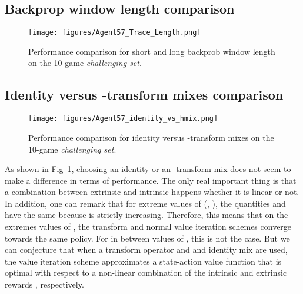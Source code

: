\documentclass{article}
\begin{document}
\clearpage
\subsection{Backprop window length comparison}
\label{app:tracelength}
\begin{figure}[!ht]
    \centering
    \texttt{[image: figures/Agent57\_Trace\_Length.png]}
    \caption{Performance comparison for short and long backprob window length on the 10-game \emph{challenging set}.}
\end{figure}

\subsection{Identity versus -transform mixes comparison}
\label{app:mix}
\begin{figure}[!ht]
    \centering
    \texttt{[image: figures/Agent57\_identity\_vs\_hmix.png]}
    \label{fig:mix}
    \caption{Performance comparison for identity versus -transform mixes on the 10-game \emph{challenging set}.}
\end{figure}
As shown in Fig~\ref{fig:mix}, choosing an identity or an -transform mix does not seem to make a difference in terms of performance. The only real important thing is that a combination between extrinsic and intrinsic happens whether it is linear or not. In addition, one can remark that for extreme values of  (, ), the quantities  and   have the same  because  is strictly increasing. Therefore, this means that on the extremes values of , the transform and normal value iteration schemes converge towards the same policy. For in between values of , this is not the case. But we can conjecture that when a transform operator and and identity mix are used, the value iteration scheme approximates a state-action value function that is optimal with respect to a non-linear combination of the intrinsic and extrinsic rewards , respectively. 
\end{document}

